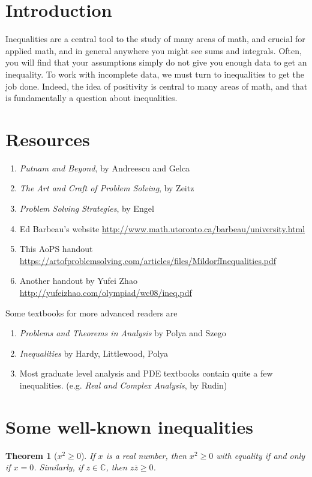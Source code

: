 \documentclass{article}
\newtheorem{theorem}{Theorem}[section]
\theoremstyle{definition}
\theoremstyle{remark}
\begin{document}
\section{Introduction}

Inequalities are a central tool to the study of many areas of math, and crucial for applied math, and in general anywhere you might see sums and integrals. Often, you will find that your assumptions simply do not give you enough data to get an inequality. To work with incomplete data, we must turn to inequalities to get the job done. Indeed, the idea of positivity is central to many areas of math, and that is fundamentally a question about inequalities.    

\section{Resources}
    \begin{enumerate}
    \item \textit{Putnam and Beyond}, by Andreescu and Gelca
    \item \textit{The Art and Craft of Problem Solving}, by Zeitz
    \item \textit{Problem Solving Strategies}, by Engel
    \item Ed Barbeau's website \href{http://www.math.utoronto.ca/barbeau/university.html}{http://www.math.utoronto.ca/barbeau/university.html}
    \item This AoPS handout \href{https://artofproblemsolving.com/articles/files/MildorfInequalities.pdf}{https://artofproblemsolving.com/articles/files/MildorfInequalities.pdf}
    \item Another handout by Yufei Zhao \href{http://yufeizhao.com/olympiad/wc08/ineq.pdf}{http://yufeizhao.com/olympiad/wc08/ineq.pdf}
\end{enumerate}
Some textbooks for more advanced readers are
\begin{enumerate}
    \item \textit{Problems and Theorems in Analysis} by Polya and Szego
    \item \textit{Inequalities} by Hardy, Littlewood, Polya
    \item Most graduate level analysis and PDE textbooks contain quite a few inequalities. (e.g. \textit{Real and Complex Analysis}, by Rudin)
\end{enumerate}

\section{Some well-known inequalities}
\begin{theorem}[$x^2 \ge 0$]
If $x$ is a real number, then $x^2 \ge 0$ with equality if and only if $x = 0$. Similarly, if $z \in \mathbb{C}$, then $z\overline{z} \ge 0$. 
\end{theorem}
\end{document}
